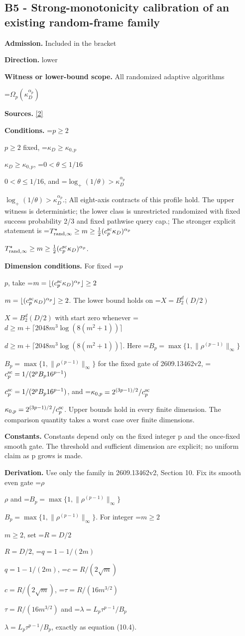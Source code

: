 \documentclass[10pt,a4paper]{article}
\newcommand{\AtlasMath}[1]{\par\begingroup\centering\setbox0=\hbox{$\displaystyle #1$}\ifdim\wd0>1.4\linewidth\typeout{ATLAS WIDE FORMULA: \the\wd0}\fi\ifdim\wd0>\linewidth\resizebox{\linewidth}{!}{\box0}\else\box0\fi\par\endgroup}
\newcommand{\AtlasInlineMath}[1]{\begingroup\setbox0=\hbox{$#1$}\ifdim\wd0>.4\linewidth\endgroup\AtlasMath{#1}\else\endgroup$#1$\fi}
\begin{document}
\subsection{B5 - Strong-monotonicity calibration of an existing random-frame family}


\textbf{Admission.} Included in the bracket



\textbf{Direction.} lower



\textbf{Witness or lower-bound scope.} All randomized adaptive algorithms



\AtlasMath{\Omega_p(\kappa_D^{\alpha_p})}


\textbf{Sources.} \href{https://arxiv.org/pdf/2609.13462v2}{[2]}



\textbf{Conditions.} \AtlasInlineMath{p\ge2} fixed, \AtlasInlineMath{\kappa_D\ge\kappa_{0,p}}, \AtlasInlineMath{0<\theta\le1/16}, and \AtlasInlineMath{\log_+(1/\theta)>\kappa_D^{\alpha_p}}.; All eight-axis contracts of this profile hold. The upper witness is deterministic; the lower class is unrestricted randomized with fixed success probability 2/3 and fixed pathwise query cap.; The stronger explicit statement is \AtlasInlineMath{T^\star_{{\rm rand},\infty}\ge m\ge\frac12(c_p^{\rm sc}\kappa_D)^{\alpha_p}}.



\textbf{Dimension conditions.} For fixed \AtlasInlineMath{p}, take \AtlasInlineMath{m=\lfloor(c_p^{\rm sc}\kappa_D)^{\alpha_p}\rfloor\ge2}. The lower bound holds on \AtlasInlineMath{X=B_2^d(D/2)} with start zero whenever \AtlasInlineMath{d\ge m+\lceil2048m^3\log(8(m^2+1))\rceil}. Here \AtlasInlineMath{B_p=\max\{1,\|\rho^{(p-1)}\|_\infty\}} for the fixed gate of 2609.13462v2, \AtlasInlineMath{c_p^{\rm sc}=1/(2^pB_p16^{p-1})}, and \AtlasInlineMath{\kappa_{0,p}=2^{(3p-1)/2}/c_p^{\rm sc}}. Upper bounds hold in every finite dimension. The comparison quantity takes a worst case over finite dimensions.



\textbf{Constants.} Constants depend only on the fixed integer p and the once-fixed smooth gate. The threshold and sufficient dimension are explicit; no uniform claim as p grows is made.



\textbf{Derivation.} Use only the family in 2609.13462v2, Section 10. Fix its smooth even gate \AtlasInlineMath{\rho} and \AtlasInlineMath{B_p=\max\{1,\|\rho^{(p-1)}\|_\infty\}}. For integer \AtlasInlineMath{m\ge2}, set \AtlasInlineMath{R=D/2}, \AtlasInlineMath{q=1-1/(2m)}, \AtlasInlineMath{c=R/(2\sqrt m)}, \AtlasInlineMath{\tau=R/(16m^{3/2})} and \AtlasInlineMath{\lambda=L_p\tau^{p-1}/B_p}, exactly as equation (10.4).
\end{document}
